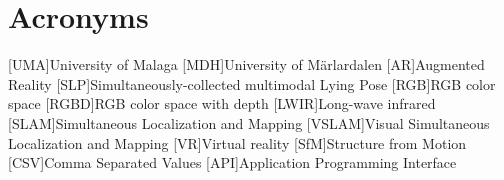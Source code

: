 \section*{Acronyms}
\begin{acronym}[MPC] %
    [UMA]{University of Malaga}
    [MDH]{University of Märlardalen}
    [AR]{Augmented Reality}
    [SLP]{Simultaneously-collected multimodal Lying Pose}
    [RGB]{RGB color space}
    [RGBD]{RGB color space with depth}
    [LWIR]{Long-wave infrared}
    [SLAM]{Simultaneous Localization and Mapping}
    [VSLAM]{Visual Simultaneous Localization and Mapping}
    [VR]{Virtual reality}
    [SfM]{Structure from Motion}
    [CSV]{Comma Separated Values}
    [API]{Application Programming Interface}
\end{acronym}

\newpage